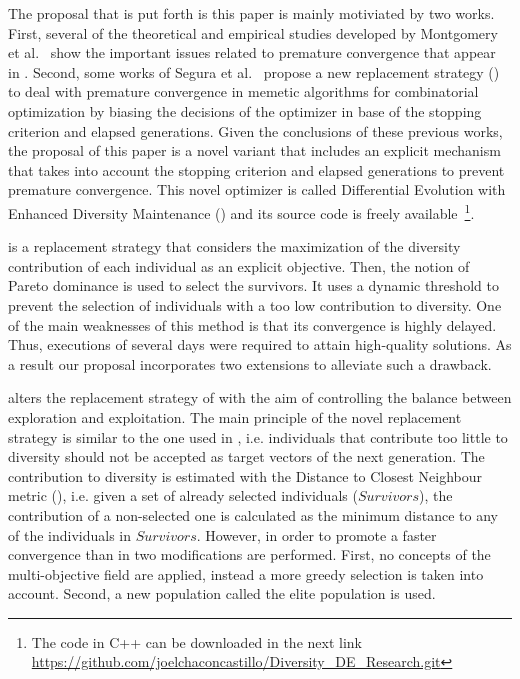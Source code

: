 The proposal that is put forth is this paper is mainly motiviated by two works.
%
First, several of the theoretical and empirical studies developed by Montgomery et al.~\cite{montgomery2012simple} show the 
important issues related to premature convergence that appear in \DE{}.
%
Second, some works of Segura et al.~\cite{segura2016novel} propose a new replacement strategy (\MULTIDYN{}) to deal with premature 
convergence in memetic algorithms
for combinatorial optimization by biasing the decisions of the optimizer in base of the stopping criterion and elapsed generations.
%
Given the conclusions of these previous works, the proposal of this paper is a novel \DE{} variant that includes an explicit mechanism 
that takes into account the stopping criterion and elapsed generations to prevent premature convergence.
%
This novel optimizer is called Differential Evolution with Enhanced Diversity Maintenance (\DEEDM{}) and its source
code is freely available~\footnote{The code in C++ can be downloaded in the next link \url{https://github.com/joelchaconcastillo/Diversity\_DE\_Research.git}}.

\MULTIDYN{} is a replacement strategy that considers the maximization of the diversity 
contribution of each individual as an explicit objective.
%
Then, the notion of Pareto dominance is used to select the survivors.
%
It uses a dynamic threshold to prevent the selection of individuals with a too low contribution to diversity.
%
One of the main weaknesses of this method is that its convergence is highly delayed.
%
Thus, executions of several days were required to attain high-quality solutions.
%
As a result our proposal incorporates two extensions to alleviate such a drawback.

\DEEDM{} alters the replacement strategy of \DE{} with the aim of controlling the 
balance between exploration and exploitation.
%
The main principle of the novel replacement strategy is similar to the one used in \MULTIDYN{}, i.e.
individuals that contribute too little to diversity should not be accepted as target vectors of the next generation.
%
The contribution to diversity is estimated with the Distance to Closest Neighbour metric (\DCN{}), i.e. given
a set of already selected individuals ($Survivors$), the contribution of a non-selected one is calculated as the minimum
distance to any of the individuals in $Survivors$.
%
However, in order to promote a faster convergence than in \MULTIDYN{} two modifications are performed.
%
First, no concepts of the multi-objective field are applied, instead a more greedy selection is taken into account.
%
Second, a new population called the elite population is used.

